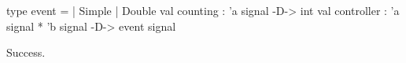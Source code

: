 \chklistingtrue
{}
\begin{ChkListingMsg}
type event   =  | Simple  | Double
val counting : 'a signal -D-> int
val controller : 'a signal * 'b signal -D-> event signal
\end{ChkListingMsg}
\begin{ChkListingErr}
Success.
\end{ChkListingErr}
